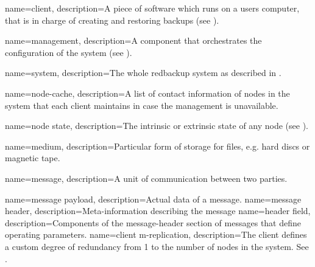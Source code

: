 {
    name={client},
    description={A piece of software which runs on a users computer, that is in charge of creating and restoring backups (see ).}
}

{
    name={management},
    description={A component that orchestrates the configuration of the system (see ).}
}

{
    name={system},
    description={The whole redbackup system as described in .}
}

{
    name={node-cache},
    description={A list of contact information of nodes in the system that each client maintains in case the management is unavailable.}
}

{
    name={node state},
    description={The intrinsic or extrinsic state of any node (see ).}
}

{
    name={medium},
    description={Particular form of storage for files, e.g. hard discs or magnetic tape.}
}

{
    name={message},
    description={A unit of communication between two parties.}
}

{
    name={message payload},
    description={Actual data of a \gls{message}.}
}
{
    name={message header},
    description={Meta-information describing the \gls{message}}
}
{
    name={header field},
    description={Components of the \gls{message-header} section of \glspl{message} that define operating parameters.}
}
{
    name={client m-replication},
    description={The \gls{client} defines a custom degree of redundancy from 1 to the number of \glspl{node} in the system. See .}
}